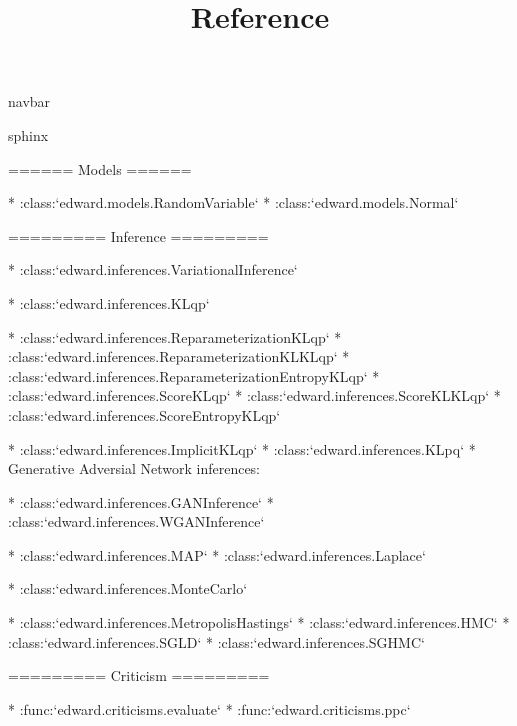 \title{Reference}

{{navbar}}

{{sphinx

======
Models
======

* :class:`edward.models.RandomVariable`
* :class:`edward.models.Normal`

=========
Inference
=========

* :class:`edward.inferences.VariationalInference`

    * :class:`edward.inferences.KLqp`

        * :class:`edward.inferences.ReparameterizationKLqp`
        * :class:`edward.inferences.ReparameterizationKLKLqp`
        * :class:`edward.inferences.ReparameterizationEntropyKLqp`
        * :class:`edward.inferences.ScoreKLqp`
        * :class:`edward.inferences.ScoreKLKLqp`
        * :class:`edward.inferences.ScoreEntropyKLqp`

    * :class:`edward.inferences.ImplicitKLqp`
    * :class:`edward.inferences.KLpq`
    * Generative Adversial Network inferences:

        * :class:`edward.inferences.GANInference`
        * :class:`edward.inferences.WGANInference`

    * :class:`edward.inferences.MAP`
    * :class:`edward.inferences.Laplace`

* :class:`edward.inferences.MonteCarlo`

    * :class:`edward.inferences.MetropolisHastings`
    * :class:`edward.inferences.HMC`
    * :class:`edward.inferences.SGLD`
    * :class:`edward.inferences.SGHMC`

=========
Criticism
=========

* :func:`edward.criticisms.evaluate`
* :func:`edward.criticisms.ppc`

}}


